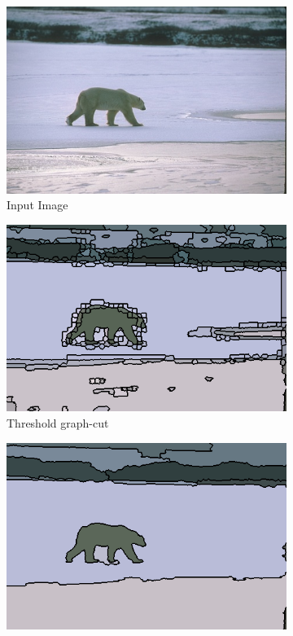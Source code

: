 \documentclass[journal]{IEEEtran}
\begin{document}
\begin{figure}[!ht]
    \centering
    \begin{subfigure}[b]{0.2\textwidth}
        \includegraphics[width=\textwidth]{100007}
        \caption{Input Image}
    \end{subfigure}\hfill
    \begin{subfigure}[b]{0.2\textwidth}
        \includegraphics[width=\textwidth]{100007_graphcut_result}
        \caption{Threshold graph-cut}
    \end{subfigure}\hfill
    \begin{subfigure}[b]{0.2\textwidth}
    	\centering
    	\includegraphics[width=\textwidth]{100007_spec_result}

\end{subfigure}
\end{figure}
\end{document}
